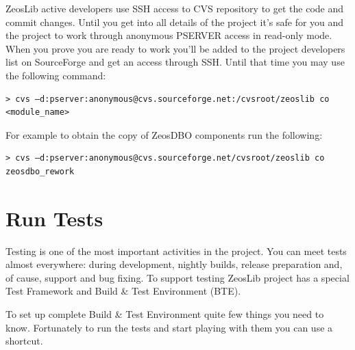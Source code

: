 \documentclass[a4paper,12pt,oneside]{book}
\begin{document}
ZeosLib active developers use SSH access to CVS repository to get the code and commit changes.
Until you get into all details of the project it’s safe for you and the project to work through anonymous PSERVER access in read-only mode.
When you prove you are ready to work you’ll be added to the project developers list on SourceForge and get an access through SSH.
Until that time you may use the following command:

\begin{verbatim}
> cvs –d:pserver:anonymous@cvs.sourceforge.net:/cvsroot/zeoslib co <module_name>
\end{verbatim}

For example to obtain the copy of ZeosDBO components run the following:

\begin{verbatim}
> cvs –d:pserver:anonymous@cvs.sourceforge.net/cvsroot/zeoslib co zeosdbo_rework
\end{verbatim}

\section{Run Tests}
Testing is one of the most important activities in the project.
You can meet tests almost everywhere: during development, nightly builds, release preparation and, of cause, support and bug fixing.
To support testing ZeosLib project has a special Test Framework and Build \& Test Environment (BTE).

To set up complete Build \& Test Environment quite few things you need to know.
Fortunately to run the tests and start playing with them you can use a shortcut. 
\end{document}
